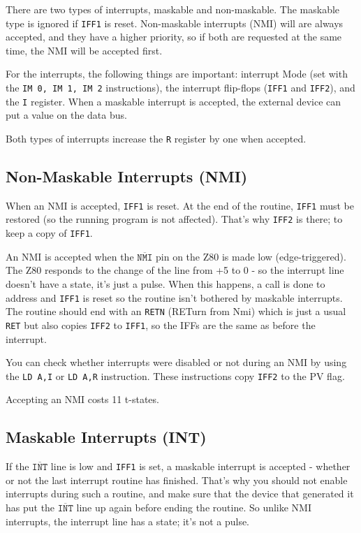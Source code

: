 There are two types of interrupts, maskable and non-maskable. The maskable type is ignored if {\tt IFF1} is reset. Non-maskable interrupts (NMI) will are always accepted, and they have a higher priority, so if both are requested at the same time, the NMI will be accepted first.

For the interrupts, the following things are important: interrupt Mode (set with the {\tt IM 0, IM 1, IM 2} instructions), the interrupt flip-flops ({\tt IFF1} and {\tt IFF2}), and the {\tt I} register. When a maskable interrupt is accepted, the external device can put a value on the data bus.

Both types of interrupts increase the {\tt R} register by one when accepted.


\subsection{Non-Maskable Interrupts (NMI)}

When an NMI is accepted, {\tt IFF1} is reset. At the end of the routine, {\tt IFF1} must be restored (so the running program is not affected). That's why {\tt IFF2} is there; to keep a copy of {\tt IFF1}.

An NMI is accepted when the $\mathtt{\overline{NMI}}$ pin on the Z80 is made low (edge-triggered). The Z80 responds to the change of the line from +5 to 0 - so the interrupt line doesn't have a state, it's just a pulse. When this happens, a call is done to address  and {\tt IFF1} is reset so the routine isn't bothered by maskable interrupts. The routine should end with an {\tt RETN} (RETurn from Nmi) which is just a usual {\tt RET} but also copies {\tt IFF2} to {\tt IFF1}, so the IFFs are the same as before the interrupt.

You can check whether interrupts were disabled or not during an NMI by using the {\tt LD A,I} or {\tt LD A,R} instruction. These instructions copy {\tt IFF2} to the PV flag.

Accepting an NMI costs 11 t-states.


\subsection{Maskable Interrupts (INT)}

If the $\mathtt{\overline{INT}}$ line is low and {\tt IFF1} is set, a maskable interrupt is accepted - whether or not the last interrupt routine has finished. That's why you should not enable interrupts during such a routine, and make sure that the device that generated it has put the $\mathtt{\overline{INT}}$ line up again before ending the routine. So unlike NMI interrupts, the interrupt line has a state; it's not a pulse.

